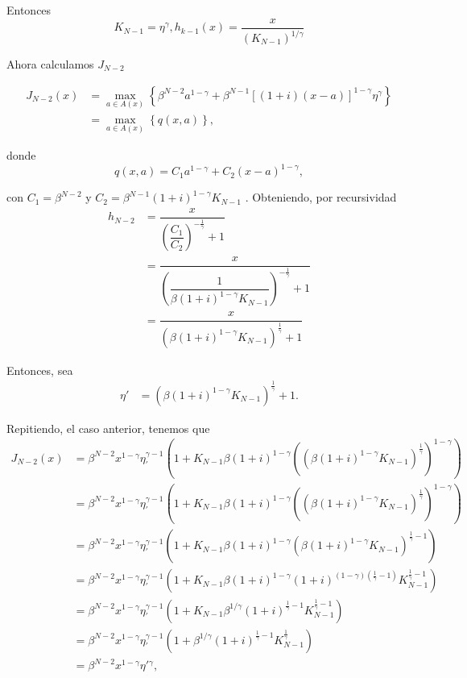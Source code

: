 \documentclass[oneside,spanish]{amsbook}
\numberwithin{section}{chapter}
\numberwithin{equation}{section}
\numberwithin{figure}{section}
\begin{document}
Entonces 
\[
K_{N-1}=\eta^{\gamma},h_{k-1}\left(x\right)=\dfrac{x}{\left(K_{N-1}\right)^{1/\gamma}}
\]

Ahora calculamos $J_{N-2}$

\begin{align*}
J_{N-2}\left(x\right) & =\max_{a\in A\left(x\right)}\left\{ \beta^{N-2}a^{1-\gamma}+\beta^{N-1}\left[\left(1+i\right)\left(x-a\right)\right]^{1-\gamma}\eta^{\gamma}\right\} \\
 & =\max_{a\in A\left(x\right)}\left\{ q\left(x,a\right)\right\} ,
\end{align*}

donde 
\[
q\left(x,a\right)=C_{1}a^{1-\gamma}+C_{2}\left(x-a\right)^{1-\gamma},
\]

con $C_{1}=\beta^{N-2}$ y $C_{2}=\beta^{N-1}\left(1+i\right)^{1-\gamma}K_{N-1}$
. Obteniendo, por recursividad 
\begin{align*}
h_{N-2} & =\dfrac{x}{\left(\dfrac{C_{1}}{C_{2}}\right)^{-\frac{1}{\gamma}}+1}\\
 & =\dfrac{x}{\left(\dfrac{1}{\beta\left(1+i\right)^{1-\gamma}K_{N-1}}\right)^{-\frac{1}{\gamma}}+1}\\
 & =\dfrac{x}{\left(\beta\left(1+i\right)^{1-\gamma}K_{N-1}\right)^{\frac{1}{\gamma}}+1}
\end{align*}

Entonces, sea 
\begin{align*}
\eta' & =\left(\beta\left(1+i\right)^{1-\gamma}K_{N-1}\right)^{\frac{1}{\gamma}}+1.
\end{align*}

Repitiendo, el caso anterior, tenemos que 
\begin{align*}
J_{N-2}\left(x\right) & =\beta^{N-2}x^{1-\gamma}\eta_{'}^{\gamma-1}\left(1+K_{N-1}\beta\left(1+i\right)^{1-\gamma}\left(\left(\beta(1+i)^{1-\gamma}K_{N-1}\right)^{\frac{1}{\gamma}}\right)^{1-\gamma}\right)\\
 & =\beta^{N-2}x^{1-\gamma}\eta_{'}^{\gamma-1}\left(1+K_{N-1}\beta\left(1+i\right)^{1-\gamma}\left(\left(\beta(1+i)^{1-\gamma}K_{N-1}\right)^{\frac{1}{\gamma}}\right)^{1-\gamma}\right)\\
 & =\beta^{N-2}x^{1-\gamma}\eta_{'}^{\gamma-1}\left(1+K_{N-1}\beta\left(1+i\right)^{1-\gamma}\left(\beta(1+i)^{1-\gamma}K_{N-1}\right)^{\frac{1}{\gamma}-1}\right)\\
 & =\beta^{N-2}x^{1-\gamma}\eta_{'}^{\gamma-1}\left(1+K_{N-1}\beta\left(1+i\right)^{1-\gamma}(1+i)^{\left(1-\gamma\right)\left(\frac{1}{\gamma}-1\right)}K_{N-1}^{\frac{1}{\gamma}-1}\right)\\
 & =\beta^{N-2}x^{1-\gamma}\eta_{'}^{\gamma-1}\left(1+K_{N-1}\beta^{1/\gamma}\left(1+i\right)^{\frac{1}{\gamma}-1}K_{N-1}^{\frac{1}{\gamma}-1}\right)\\
 & =\beta^{N-2}x^{1-\gamma}\eta_{'}^{\gamma-1}\left(1+\beta^{1/\gamma}\left(1+i\right)^{\frac{1}{\gamma}-1}K_{N-1}^{\frac{1}{\gamma}}\right)\\
 & =\beta^{N-2}x^{1-\gamma}\eta'{}^{\gamma},
\end{align*}
\end{document}
